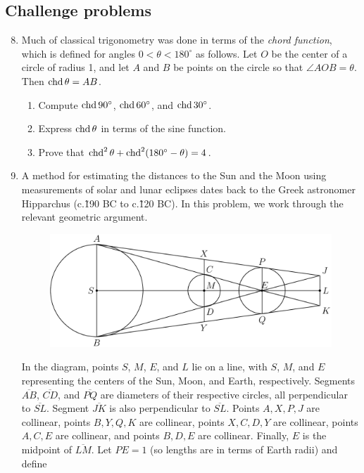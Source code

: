 \subsection{Challenge problems}

\begin{enumerate}\setcounter{enumi}{7}
\item Much of classical trigonometry was done in terms of the \emph{chord function}, which is defined for angles $0 < \theta < 180^{\circ}$ as follows. Let $O$ be the center of a circle of radius 1, and let $A$ and $B$ be points on the circle so that $\angle AOB = \theta$. Then $\operatorname{chd}\theta = AB$.
\begin{enumerate}
\item Compute $\operatorname{chd} 90^{\circ}$, $\operatorname{chd} 60^{\circ}$, and $\operatorname{chd} 30^{\circ}$.
\item Express $\operatorname{chd}\theta$ in terms of the sine function.
\item Prove that $\operatorname{chd}^2\theta + \operatorname{chd}^2(180^{\circ} - \theta) = 4$.
\end{enumerate}\newpage
\item A method for estimating the distances to the Sun and the Moon using measurements of solar and lunar eclipses dates back to the Greek astronomer Hipparchus (c.\~190 BC to c.\~120 BC). In this problem, we work through the relevant geometric argument.
\begin{figure}[H]
\centering
\includegraphics[scale=0.4]{img-hipparchus-2.png}
\end{figure}
In the diagram, points $S$, $M$, $E$, and $L$ lie on a line, with $S$, $M$, and $E$ representing the centers of the Sun, Moon, and Earth, respectively. Segments $\overline{AB}$, $\overline{CD}$, and $\overline{PQ}$ are diameters of their respective circles, all perpendicular to $\overline{SL}$. Segment $\overline{JK}$ is also perpendicular to $\overline{SL}$. Points $A, X, P, J$ are collinear, points $B, Y, Q, K$ are collinear, points $X, C, D, Y$ are collinear, points $A, C, E$ are collinear, and points $B, D, E$ are collinear. Finally, $E$ is the midpoint of $\overline{LM}$. Let $PE = 1$ (so lengths are in terms of Earth radii) and define

\end{enumerate}
